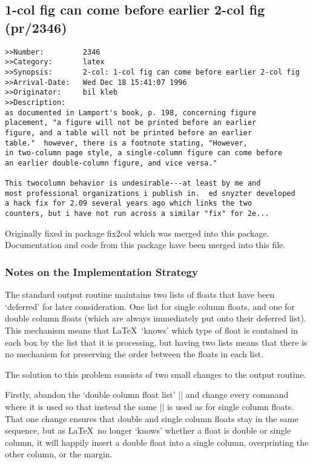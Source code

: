 \documentclass{ltxguide}
\newcommand\Lpack[1]{\mbox{\textsf{#1}}}
\begin{document}
\subsection{1-col fig can come before earlier 2-col fig
           (pr/2346)}

\begin{verbatim}
>>Number:         2346
>>Category:       latex
>>Synopsis:       2-col: 1-col fig can come before earlier 2-col fig
>>Arrival-Date:   Wed Dec 18 15:41:07 1996
>>Originator:     bil kleb
>>Description:
as documented in Lamport's book, p. 198, concerning figure
placement, "a figure will not be printed before an earlier
figure, and a table will not be printed before an earlier
table."  however, there is a footnote stating, "However,
in two-column page style, a single-column figure can come before
an earlier double-column figure, and vice versa."

This twocolumn behavior is undesirable---at least by me and
most professional organizations i publish in.  ed snyzter developed
a hack fix for 2.09 several years ago which links the two
counters, but i have not run across a similar "fix" for 2e...
\end{verbatim}

Originally fixed in package \Lpack{fix2col} which was merged into
this package. Documentation and code from this package have been
merged into this file.

\subsubsection{Notes on the Implementation Strategy}

The standard output routine maintains two lists of floats that have
been `deferred' for later consideration. One list for single column
floats, and one for double column floats (which are always
immediately put onto their deferred list). This mechanism means
that \LaTeX\ `knows' which type of float is contained in each box
by the list that it is processing, but having two lists means
that there is no mechanism for preserving the order between the
floats in each list.

The solution to this problem consists of two small changes to
the output routine.

Firstly, abandon the `double column float list' |\@dbldeferlist|
and change every command where it is used so that instead the
same |\@deferlist| is used as for single column floats.
That one change ensures that double and single column floats
stay in the same sequence, but as \LaTeX\ no longer `knows'
whether a float is double or single column, it will happily
insert a double float into a single column, overprinting the
other column, or the margin.
\end{document}
